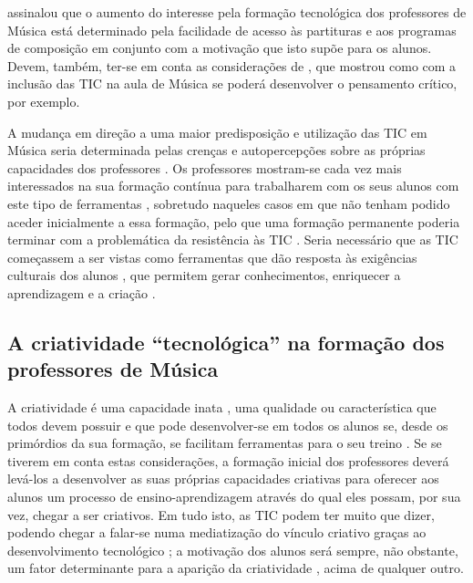 \documentclass{textolivre}
\begin{document}
\textcite{hepp2002} assinalou que o aumento do interesse pela formação tecnológica dos
professores de Música está determinado pela facilidade de acesso às partituras
e aos programas de composição em conjunto com a motivação que isto supõe para
os alunos. Devem, também, ter-se em conta as considerações de \textcite{tourinan2018},
que mostrou como com a inclusão das TIC na aula de Música se poderá desenvolver
o pensamento crítico, por exemplo.

A mudança em direção a uma maior predisposição e utilização das TIC em Música
\cite{dezlatorre2018} seria determinada pelas crenças e autopercepções sobre as
próprias capacidades dos professores \cite{colasbravo2014}. Os
professores mostram-se cada vez mais interessados na sua formação contínua para
trabalharem com os seus alunos com este tipo de ferramentas \cite{vaquer2012}, 
sobretudo naqueles casos em que não tenham podido aceder
inicialmente a essa formação, pelo que uma formação permanente poderia terminar
com a problemática da resistência às TIC \cite{colasbravo2017}.
Seria necessário que as TIC começassem a ser vistas como ferramentas que
dão resposta às exigências culturais dos alunos \cite{romero2004}, que permitem
gerar conhecimentos, enriquecer a aprendizagem e a criação \cite{CaberoAlmenara2019}.



\subsection{A criatividade “tecnológica” na formação dos professores de Música}\label{sec-criatividade}

A criatividade é uma capacidade inata \cite{lago2012}, uma
qualidade ou característica que todos devem possuir \cite{torres2017} e que pode
desenvolver-se em todos os alunos se, desde os primórdios da sua formação, se
facilitam ferramentas para o seu treino \cite{vecina2006}. Se se tiverem em conta
estas considerações, a formação inicial dos professores deverá levá-los a
desenvolver as suas próprias capacidades criativas para oferecer aos alunos um
processo de ensino-aprendizagem através do qual eles possam, por sua vez,
chegar a ser criativos. Em tudo isto, as TIC podem ter muito que dizer, podendo
chegar a falar-se numa mediatização do vínculo criativo graças ao
desenvolvimento tecnológico \cite{padula2016}; a motivação dos alunos será sempre,
não obstante, um fator determinante para a aparição da criatividade \cite{gomezcantero2005}, 
acima de qualquer outro.
\end{document}
